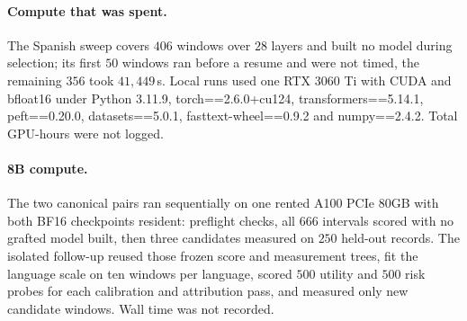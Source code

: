 \documentclass{article}
\newcommand{\artifact}[1]{\textsf{#1}}
\theoremstyle{plain}
\theoremstyle{definition}
\theoremstyle{remark}
\begin{document}
\paragraph{Compute that was spent.}
The Spanish sweep covers $406$ windows over $28$ layers and built no model during
selection; its first $50$ windows ran before a resume and were not timed, the
remaining $356$ took $41{,}449$\,s. Local runs used one RTX 3060 Ti with CUDA and
bfloat16 under Python 3.11.9, \artifact{torch==2.6.0+cu124},
\artifact{transformers==5.14.1}, \artifact{peft==0.20.0},
\artifact{datasets==5.0.1}, \artifact{fasttext-wheel==0.9.2} and
\artifact{numpy==2.4.2}. Total GPU-hours were not logged.

\paragraph{8B compute.}
The two canonical pairs ran sequentially on one rented A100 PCIe 80GB with both
BF16 checkpoints resident: preflight checks, all $666$ intervals scored with no
grafted model built, then three candidates measured on $250$ held-out records.
The isolated follow-up reused those frozen score and measurement trees, fit the
language scale on ten windows per language, scored $500$ utility and $500$ risk
probes for each calibration and attribution pass, and measured only new
candidate windows. Wall time was not recorded.


\end{document}
